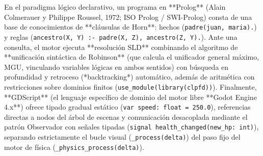 \documentclass{book}
\begin{document}
En el paradigma lógico declarativo, un programa en **Prolog** (Alain Colmerauer y Philippe Roussel, 1972; ISO Prolog / SWI-Prolog) consta de una base de conocimientos de **cláusulas de Horn**: hechos (\texttt{padre(juan, maria).}) y reglas (\texttt{ancestro(X, Y) :- padre(X, Z), ancestro(Z, Y).}). Ante una consulta, el motor ejecuta **resolución SLD** combinando el algoritmo de **unificación sintáctica de Robinson** (que calcula el unificador general máximo, MGU, vinculando variables lógicas en ambos sentidos) con búsqueda en profundidad y retroceso (*backtracking*) automático, además de aritmética con restricciones sobre dominios finitos (\texttt{use\_module(library(clpfd))}). Finalmente, **GDScript** (el lenguaje específico de dominio del motor libre **Godot Engine 4.x**) ofrece tipado gradual estático (\texttt{var speed: float = 250.0}), referencias directas a nodos del árbol de escenas y comunicación desacoplada mediante el patrón Observador con señales tipadas (\texttt{signal health\_changed(new\_hp: int)}), separando estrictamente el bucle visual (\texttt{\_process(delta)}) del paso fijo del motor de física (\texttt{\_physics\_process(delta)}).
\end{document}
